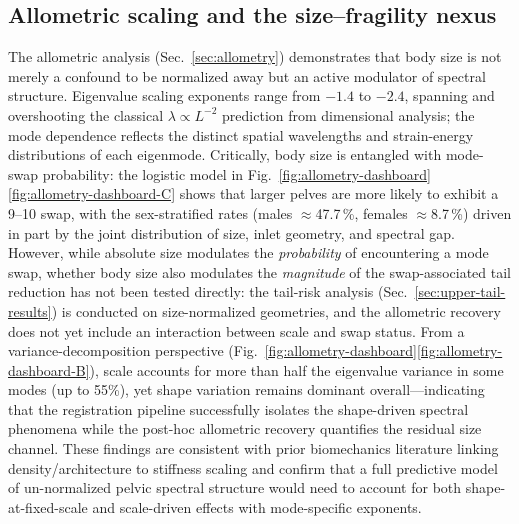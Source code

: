 \documentclass[11pt]{article}
\begin{document}
\subsection*{Allometric scaling and the size--fragility nexus}
The allometric analysis (Sec.~\ref{sec:allometry}) demonstrates that body size is not merely a confound to be normalized away but an active modulator of spectral structure.
Eigenvalue scaling exponents range from $-1.4$ to $-2.4$, spanning and overshooting the classical $\lambda \propto L^{-2}$ prediction from dimensional analysis; the mode dependence reflects the distinct spatial wavelengths and strain-energy distributions of each eigenmode.
Critically, body size is entangled with mode-swap probability: the logistic model in Fig.~\ref{fig:allometry-dashboard}\ref{fig:allometry-dashboard-C} shows that larger pelves are more likely to exhibit a 9--10 swap, with the sex-stratified rates (males $\approx$47.7\,\%, females $\approx$8.7\,\%) driven in part by the joint distribution of size, inlet geometry, and spectral gap.
However, while absolute size modulates the \emph{probability} of encountering a mode swap, whether body size also modulates the \emph{magnitude} of the swap-associated tail reduction has not been tested directly: the tail-risk analysis (Sec.~\ref{sec:upper-tail-results}) is conducted on size-normalized geometries, and the allometric recovery does not yet include an interaction between scale and swap status.
From a variance-decomposition perspective (Fig.~\ref{fig:allometry-dashboard}\ref{fig:allometry-dashboard-B}), scale accounts for more than half the eigenvalue variance in some modes (up to 55\%), yet shape variation remains dominant overall---indicating that the registration pipeline successfully isolates the shape-driven spectral phenomena while the post-hoc allometric recovery quantifies the residual size channel.
These findings are consistent with prior biomechanics literature linking density/architecture to stiffness scaling \citep{Frost1987,Huiskes1987} and confirm that a full predictive model of un-normalized pelvic spectral structure would need to account for both shape-at-fixed-scale and scale-driven effects with mode-specific exponents.
\end{document}
